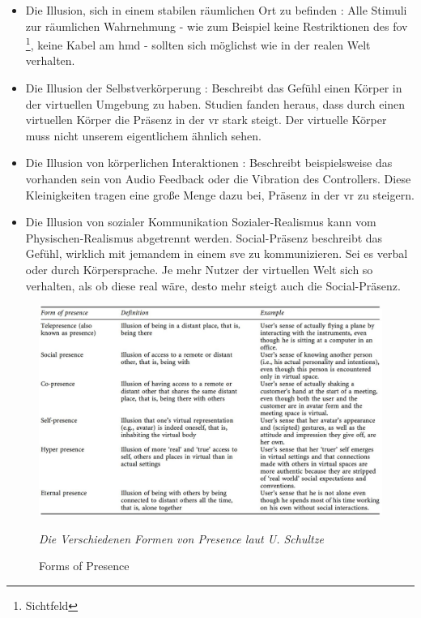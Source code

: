 \documentclass[a4paper,11pt]{article}%
\renewcommand{\\}{\vspace*{0.5\baselineskip} \newline}
\begin{document}
\begin{itemize}
	\item{Die Illusion, sich in einem stabilen räumlichen Ort zu befinden} : Alle Stimuli zur räumlichen Wahrnehmung - wie zum Beispiel keine Restriktionen des \ac{fov} \footnote{Sichtfeld}, keine Kabel am \ac{hmd} - sollten sich möglichst wie in der realen Welt verhalten. \citep[p.47]{jerald2015vr}
	\item{Die Illusion der Selbstverkörperung} : Beschreibt das Gefühl einen Körper in der virtuellen Umgebung zu haben. Studien fanden heraus, dass durch einen virtuellen Körper die Präsenz in der \ac{vr} stark steigt. \citep[p.756]{botvinick1998rubber} Der virtuelle Körper muss nicht unserem eigentlichem ähnlich sehen. \citep[p.7]{maxwell1960psycho}
	\item{Die Illusion von körperlichen Interaktionen} : Beschreibt beispielsweise das vorhanden sein von Audio Feedback oder die Vibration des Controllers. Diese Kleinigkeiten tragen eine große Menge dazu bei, Präsenz in der \ac{vr} zu steigern. \citep[p.48]{jerald2015vr}
	\item{Die Illusion von sozialer Kommunikation} Sozialer-Realismus kann vom Physischen-Realismus abgetrennt werden. Social-Präsenz beschreibt das Gefühl, wirklich mit jemandem in einem \ac{sve} zu kommunizieren. Sei es verbal oder durch Körpersprache. Je mehr Nutzer der virtuellen Welt sich so verhalten, als ob diese real wäre, desto mehr steigt auch die Social-Präsenz. \citep[p.49]{jerald2015vr} \citep[p.12]{guadagno2007virtual}
\end{itemize}

\begin{figure}[H]
		\begin{footnotesize}
		\centering
			\includegraphics[scale= 0.4]{Abbildungen/forms_presence.JPG}
			\caption[Abbildung 1]{Forms of Presence}
			\textit{Die Verschiedenen Formen von Presence laut U.  Schultze \citep{schultze2010embodiment} }
			\label{vertical_horizontal}
		\end{footnotesize}
	\end{figure}
\end{document}
